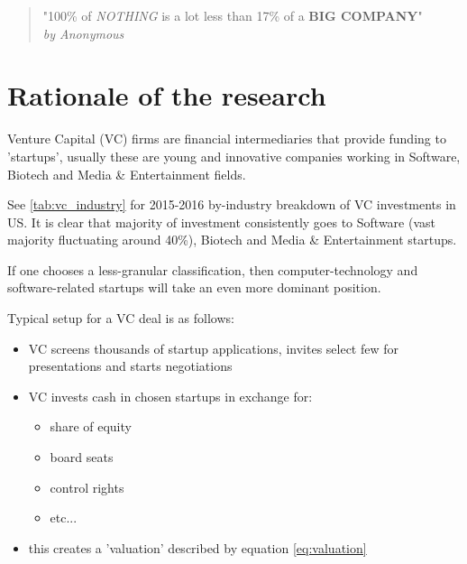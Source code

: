

\begin{quote} 
    \centering 
        "100\% of \textit{NOTHING} is a lot less than 17\% of a \textbf{BIG COMPANY}"\\
    \raggedleft
        \emph{by Anonymous}
\end{quote}

\section{Rationale of the research}

Venture Capital (VC) firms are financial intermediaries  that provide funding to 'startups', usually these are young and innovative companies working in Software, Biotech and Media \& Entertainment fields.

See \ref{tab:vc_industry} for 2015-2016 by-industry breakdown of VC investments in US.
It is clear that majority of investment consistently goes to Software (vast majority fluctuating around 40\%), Biotech and Media \& Entertainment startups.

If one chooses a less-granular classification, then computer-technology and software-related startups will take an even more dominant position.

Typical setup for a VC deal is as follows:
\begin{itemize}
    \item VC screens thousands of startup applications, invites select few for presentations and starts negotiations
    \item VC invests cash in chosen startups in exchange for:
        \begin{itemize}
            \item share of equity
            \item board seats
            \item control rights
            \item etc...
        \end{itemize}
    \item this creates a 'valuation' described by equation \ref{eq:valuation}
\end{itemize}

